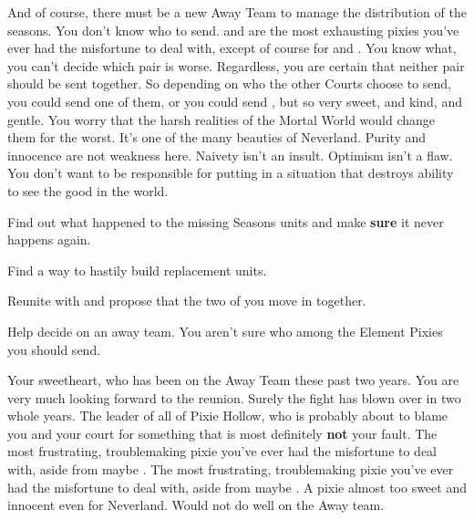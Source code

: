 \documentclass[char]{PP}
\begin{document}
And of course, there must be a new Away Team to manage the distribution of the seasons.  You don't know who to send. \cETitan{} and \cFTitan{} are the most exhausting pixies you've ever had the misfortune to deal with, except of course for \cEAirship{} and \cMAirship{}. You know what, you can't decide which pair is worse. Regardless, you are certain that neither pair should be sent together. So depending on who the other Courts choose to send, you could send one of them, or you could send \cESweet{}, but \cESweet{\they} \cESweet{\are} so very sweet, and kind, and gentle. You worry that the harsh realities of the Mortal World would change them for the worst. It's one of the many beauties of Neverland. Purity and innocence are not weakness here. Naivety isn't an insult. Optimism isn't a flaw. You don't want to be responsible for putting \cESweet{} in a situation that destroys \cESweet{\their} ability to see the good in the world.


\begin{itemz}
	\item Find out what happened to the missing Seasons units and make \textbf{sure} it never happens again.
	\item Find a way to hastily build replacement units.
	\item Reunite with \cELove{} and propose that the two of you move in together.
	\item Help \cSHead{} decide on an away team. You aren't sure who among the Element Pixies you should send.
\end{itemz}

\begin{itemz}[Notes]
	\item 
\end{itemz}

\begin{contacts}
	\contact{\cELove{}} Your sweetheart, who has been on the Away Team these past two years. You are very much looking forward to the reunion. Surely the fight has blown over in two whole years.
	\contact{\cSHead{}} The leader of all of Pixie Hollow, who is probably about to blame you and your court for something that is most definitely \textbf{not} your fault.
	\contact{\cEAirship{}} The most frustrating, troublemaking pixie you've ever had the misfortune to deal with, aside from maybe \cETitan{}.
	\contact{\cETitan{}} The most frustrating, troublemaking pixie you've ever had the misfortune to deal with, aside from maybe \cEAirship{}.
	\contact{\cESweet{}} A pixie almost too sweet and innocent even for Neverland. Would not do well on the Away team.
\end{contacts}
\end{document}
